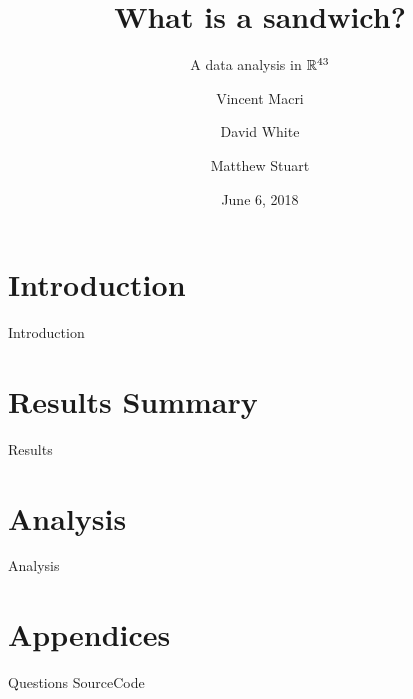 

\title{What is a sandwich?}
\subtitle{A data analysis in $\mathbb{R}^{43}$}
\author{Vincent Macri \and David White \and Matthew Stuart}
\date{June 6, 2018}


	\maketitle
	
	\tableofcontents
	\clearpage
	\part{Introduction}\label{part:introduction}
		{Introduction}
	\part{Results Summary}\label{part:results}
		{Results}
	\part{Analysis}\label{part:analysis}
		{Analysis}
	\appendix
	\part{Appendices}\label{part:appendix}
		{Questions}
		{SourceCode}
	\nocite{*}
	\printbibliography

